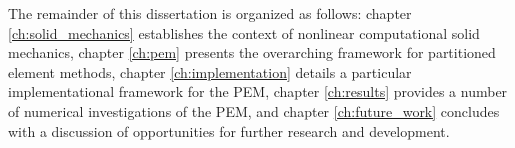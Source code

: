 	The remainder of this dissertation is organized as follows: chapter \ref{ch:solid_mechanics} establishes the context of nonlinear computational solid mechanics, chapter \ref{ch:pem} presents the overarching framework for partitioned element methods, chapter \ref{ch:implementation} details a particular implementational framework for the PEM, chapter \ref{ch:results} provides a number of numerical investigations of the PEM, and chapter \ref{ch:future_work} concludes with a discussion of opportunities for further research and development.